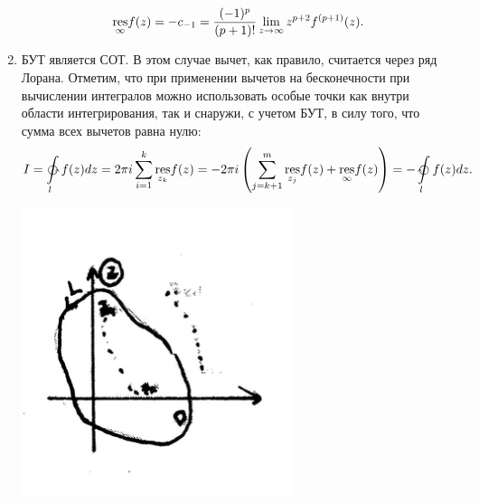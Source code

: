 \documentclass[../../main.tex]{subfiles}
\begin{document}
\begin{enumerate}
	 	\begin{equation}
	 	\underset{\infty}{\operatorname{res}}f(z)=-c_{-1}=\dfrac{(-1)^p}{(p+1)!} 
	 	\lim\limits_{z\rightarrow\infty}z^{p+2}f^{(p+1)}(z).
	 	\end{equation}
	 	
	 	\item
	 	БУТ является СОТ. В этом случае вычет, как правило, считается через ряд 
	 	Лорана. 
	 	Отметим, что при применении вычетов на бесконечности при вычислении 
	 	интегралов можно использовать особые точки как внутри области 
	 	интегрирования, так и снаружи, с учетом БУТ, в силу того, что сумма всех 
	 	вычетов равна нулю:
	 	\[
	 	I=\ointctrclockwise
	 	\limits_lf(z)dz=2\pi i \sum_{i=1}^{k}\underset{z_k}{\res}f(z)=-2\pi 
	 	i\left(\sum_{j=k+1}^{m}\underset{z_j}{\res}f(z)+\underset{\infty}{\res}f(z)
	 	\right)=
	 	-\ointclockwise\limits_lf(z)dz.
	 	\]
	 	\begin{center}
	 	\includegraphics{lec35_2}
	 	\end{center}
	 \end{enumerate}
	 
\end{document}
